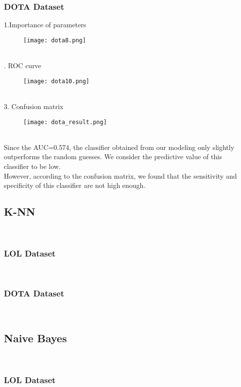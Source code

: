 \documentclass[a4paper,fleqn]{cas-sc}
\begin{document}
\subsubsection{DOTA Dataset}
 1.Importance of parameters\\
 \begin{figure}[h!]
	\centering
		\texttt{[image: dota8.png]}
	\caption{}
	\label{FIG:1}
\end{figure}\\
. ROC curve\\
\begin{figure}[h!]
	\centering
		\texttt{[image: dota10.png]}
	\caption{}
	\label{FIG:1}
\end{figure}\\
3. Confusion matrix\\
\begin{figure}[h!]
	\centering
		\texttt{[image: dota\_result.png]}
	\caption{}
	\label{FIG:1}
\end{figure}\\
Since the AUC=0.574, the classifier obtained from our modeling only slightly outperforms the random guesses. We consider the predictive value of this classifier to be low.\\
However, according to the confusion matrix, we found that the sensitivity and specificity of this classifier are not high enough.\\

\subsection{K-NN}
 \\
\subsubsection{LOL Dataset}
 \\
\subsubsection{DOTA Dataset}
 \\
\subsection{Naive Bayes}
 \\
\subsubsection{LOL Dataset}
 \\
\end{document}
